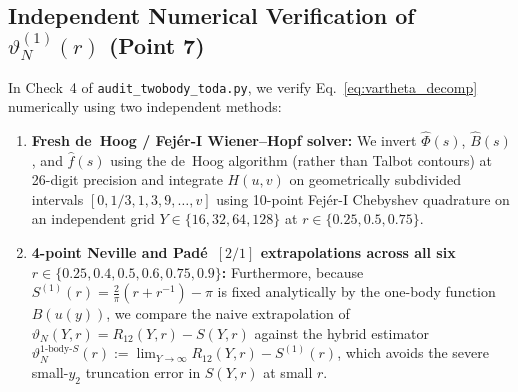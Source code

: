 \documentclass[11pt,a4paper]{article}
\begin{document}
\subsection{Independent Numerical Verification of \texorpdfstring{$\vartheta_N^{(1)}(r)$}{vartheta\_N\^{}(1)(r)} (Point 7)}

In Check~4 of \texttt{audit\_twobody\_toda.py}, we verify Eq.~\eqref{eq:vartheta_decomp} numerically using two independent methods:
\begin{enumerate}[leftmargin=2em]
  \item \textbf{Fresh de~Hoog / Fej\'er-I Wiener--Hopf solver:} We invert $\widehat{\Phi}(s)$, $\widehat{B}(s)$, and $\widehat{f}(s)$ using the de~Hoog algorithm (rather than Talbot contours) at 26-digit precision and integrate $H(u,v)$ on geometrically subdivided intervals $[0,1/3,1,3,9,\dots,v]$ using 10-point Fej\'er-I Chebyshev quadrature on an independent grid $Y\in\{16,32,64,128\}$ at $r\in\{0.25,0.5,0.75\}$.
  \item \textbf{4-point Neville and Pad\'e~$[2/1]$ extrapolations across all six $r\in\{0.25,0.4,0.5,0.6,0.75,0.9\}$:} Furthermore, because $S^{(1)}(r)=\frac{2}{\pi}(r+r^{-1})-\pi$ is fixed analytically by the one-body function $B(u(y))$, we compare the naive extrapolation of $\vartheta_N(Y,r)=R_{12}(Y,r)-S(Y,r)$ against the hybrid estimator $\vartheta_N^{\text{1-body-}S}(r) := \lim_{Y\to\infty} R_{12}(Y,r) - S^{(1)}(r)$, which avoids the severe small-$y_2$ truncation error in $S(Y,r)$ at small $r$.
\end{enumerate}
\end{document}
